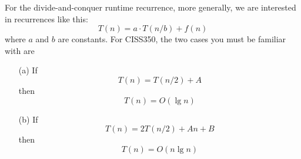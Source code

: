 \begin{comment}
%        
%
%
\newpage
\begin{ex}
  \begin{tightlist}
    \item
    Let
    \[
    T(n) = T(\floor{n/2}) + T(n - \floor{n/2}) + n
    \]
    and $T(n) = 1$ if $n \leq 1$.
    Compute (by hand) and
    write down the table for $T(n)$ for $n = 0, 1, 2, ..., 9$.
    \item
    Let
    \[
    T'(n) = 2T'(n/2) + n
    \]
    and $T'(n) = 1$ if $n \leq 1$.
    Compute (by hand) and
    write down the table for $T'(n)$ for $n = 0, 1, 2, ..., 9$.
    \item
    Plot more values for $T(n)$ and $T'(n)$ ... as in \textit{lots} of $n$'s.
    Can you find good approximation for $T(n)$?
    (Here good mean functions such as $n^\alpha$, $\ln^\alpha n$,
    $n^\alpha \ln^\beta n$, $c^n$, etc.
  You'll see that asymptotically (when $n$ is large),
  $T(n)$ and $T'(n)$ are about the same.
  \end{tightlist}
  \qed
\end{ex}

The above experiments will show you that for our recurrences,
asymptotically (when $n$ is large),
it doesn't matter if $n/2$ is replaced by $\floor{n/2}$ or
$\ceiling{n/2}$ or
when $n - \floor{n/2}$ or $n - \ceiling{n/2}$ is replaced by
$n/2$.

\end{comment}

For the divide-and-conquer runtime recurrence,
more generally, we are interested in recurrences like this:
\[
T(n) = a \cdot T(n/b) + f(n)
\]
where $a$ and $b$ are constants.
For CISS350,
the two cases you must be familiar with are

\begin{thm}
  \mbox{}
  \begin{enumerate}[nosep]
  \item[\textnormal{(a)}] If \[
    T(n) = T(n/2) + A
    \]
    then
    \[
    T(n) = O(\lg n)
    \]
  \item[\textnormal{(b)}]
    If
    \[
    T(n) = 2 T(n/2) + An + B 
    \]
    then
    \[
    T(n) = O(n \lg n)
    \]
  \end{enumerate}
\end{thm}

